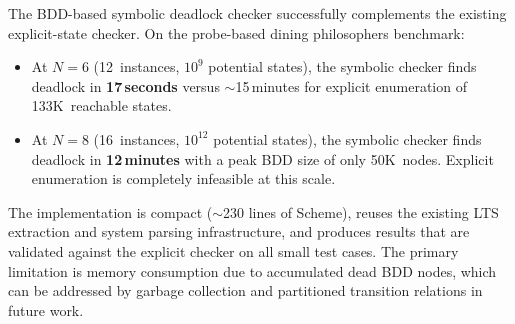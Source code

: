 \documentclass[11pt]{article}
\begin{document}
The BDD-based symbolic deadlock checker successfully complements the
existing explicit-state checker.  On the probe-based dining
philosophers benchmark:

\begin{itemize}
\item At $N=6$ (12~instances, $10^9$ potential states), the symbolic
      checker finds deadlock in \textbf{17\,seconds} versus
      $\sim$15\,minutes for explicit enumeration of 133K~reachable states.

\item At $N=8$ (16~instances, $10^{12}$ potential states), the symbolic
      checker finds deadlock in \textbf{12\,minutes} with a peak BDD
      size of only 50K~nodes.  Explicit enumeration is completely
      infeasible at this scale.
\end{itemize}

The implementation is compact ($\sim$230 lines of Scheme), reuses the
existing LTS extraction and system parsing infrastructure, and
produces results that are validated against the explicit checker on all
small test cases.  The primary limitation is memory consumption due to
accumulated dead BDD nodes, which can be addressed by garbage
collection and partitioned transition relations in future work.
\end{document}
